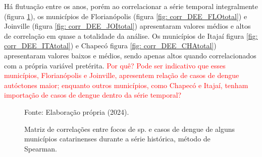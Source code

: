 \documentclass[
	12pt,				%
	openright,			%
	oneside,			%
	a4paper,			%
	english,			%
	french,				%
	spanish,			%
	brazil				%
	dvipsnames, table]{abntex2}
\begin{document}
Há flutuação entre os anos, porém ao correlacionar a série temporal integralmente (figura \ref{fig: matriz_corr_DEEtotal}), os municípios de Florianópolis (figura \ref{fig: corr_DEE_FLOtotal}) e Joinville (figura \ref{fig: corr_DEE_JOItotal}) apresentaram valores médios e altos de correlação em quase a totalidade da análise. Os municípios de Itajaí figura \ref{fig: corr_DEE_ITAtotal}) e Chapecó figura \ref{fig: corr_DEE_CHAtotal}) apresentaram valores baixos e médios, sendo apenas altos quando correlacionados com a própria variável pretérita.  \textcolor{red}{Por quê? Pode ser indicativo que esses municípios, Florianópolis e Joinville, apresentem relação de casos de dengue autóctones maior; enquanto outros municípios, como Chapecó e Itajaí, tenham importação de casos de dengue dentro da série temporal?}



\begin{figure}[htbp]
    \begin{center}
    \caption{Matriz de correlações entre focos de  sp. e casos de dengue de alguns municípios catarinenses durante a série histórica, método de Spearman.}
    \label{fig: matriz_corr_DEEtotal}
    \hfill
    \hfill
    \end{center}
    \small{Fonte: Elaboração própria (2024).}
\end{figure}
\end{document}

